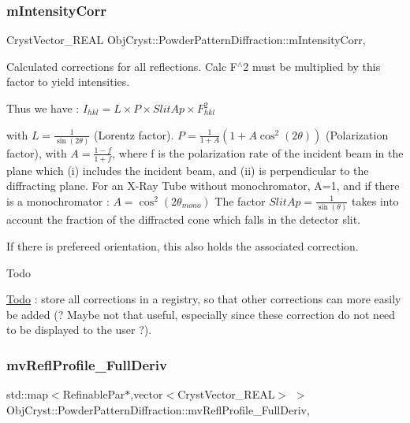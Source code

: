 \subsubsection{\texorpdfstring{mIntensityCorr}{mIntensityCorr}}
{\footnotesize\ttfamily Cryst\+Vector\+\_\+\+R\+E\+AL Obj\+Cryst\+::\+Powder\+Pattern\+Diffraction\+::m\+Intensity\+Corr\hspace{0.3cm}{\ttfamily [mutable]}, {\ttfamily [protected]}}



Calculated corrections for all reflections. Calc F$^\wedge$2 must be multiplied by this factor to yield intensities. 

Thus we have \+: $ I_{hkl} = L \times P \times SlitAp \times F_{hkl}^2 $

with $ L = \frac{1}{\sin(2\theta)} $ (Lorentz factor). $ P = \frac{1}{1+A}\left(1+A\cos^2(2\theta)\right) $ (Polarization factor), with $ A = \frac{1-f}{1+f} $, where f is the polarization rate of the incident beam in the plane which (i) includes the incident beam, and (ii) is perpendicular to the diffracting plane. For an X-\/\+Ray Tube without monochromator, A=1, and if there is a monochromator \+: $ A = \cos^2(2\theta_{mono}) $ The factor $ SlitAp = \frac{1}{\sin(\theta)} $ takes into account the fraction of the diffracted cone which falls in the detector slit.

If there is prefereed orientation, this also holds the associated correction.

\begin{DoxyRefDesc}{Todo}
\item[\mbox{\hyperlink{todo__todo000005}{Todo}}]\+: store all corrections in a registry, so that other corrections can more easily be added (? Maybe not that useful, especially since these correction do not need to be displayed to the user ?). \end{DoxyRefDesc}
\mbox{\label{class_obj_cryst_1_1_powder_pattern_diffraction_a41442a823c1633b37ab85b4bba910dd3}} 
\subsubsection{\texorpdfstring{mvReflProfile\_FullDeriv}{mvReflProfile\_FullDeriv}}
{\footnotesize\ttfamily std\+::map$<$Refinable\+Par$\ast$,vector$<$Cryst\+Vector\+\_\+\+R\+E\+AL$>$ $>$ Obj\+Cryst\+::\+Powder\+Pattern\+Diffraction\+::mv\+Refl\+Profile\+\_\+\+Full\+Deriv\hspace{0.3cm}{\ttfamily [mutable]}, {\ttfamily [protected]}}

